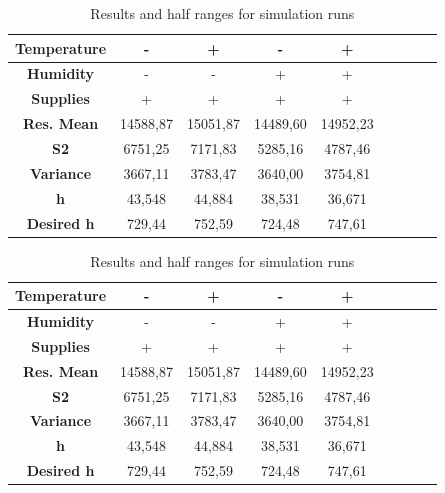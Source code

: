 \documentclass[conference]{IEEEtran}
\begin{document}
\begin{enumerate}
    \begin{table}[]
    \caption{Results and half ranges for simulation runs}
    \begin{center}
    \begin{tabular}{|c|c|c|c|c|c|c|c|c|}
    \hline
    \textbf{Temperature} & - & + & - & + \\
    \hline
    \textbf{Humidity} & - & - & + & + \\
    \hline
    \textbf{Supplies} &+&+&+&+ \\
    \hline
    \textbf{Res. Mean} & 14588,87&15051,87&14489,60&14952,23 \\
    \hline
    \textbf{S2}& 6751,25&7171,83&5285,16&4787,46 \\
    \hline
    \textbf{Variance}&3667,11&3783,47&3640,00&3754,81\\
    \hline
    \textbf{h} &43,548&44,884&38,531&36,671\\
    \hline
    \textbf{Desired h}&729,44&752,59&724,48&747,61\\
    \hline
    \end{tabular}
    \label{tab:rep_significance}
    \end{center}
    \end{table}

    \begin{table}[]
    \caption{Results and half ranges for simulation runs}
    \begin{center}
    \begin{tabular}{|c|c|c|c|c|c|c|c|c|}
    \hline
    \textbf{Temperature} & - & + & - & + \\
    \hline
    \textbf{Humidity} & - & - & + & + \\
    \hline
    \textbf{Supplies} &+&+&+&+ \\
    \hline
    \textbf{Res. Mean} & 14588,87&15051,87&14489,60&14952,23 \\
    \hline
    \textbf{S2}& 6751,25&7171,83&5285,16&4787,46 \\
    \hline
    \textbf{Variance}&3667,11&3783,47&3640,00&3754,81\\
    \hline
    \textbf{h}&43,548&44,884&38,531&36,671\\
    \hline
    \textbf{Desired h}&729,44&752,59&724,48&747,61\\
    \hline
    \end{tabular}
    \label{tab:rep_significance_2}
    \end{center}
    \end{table}


\end{enumerate}
\end{document}
